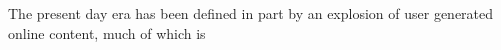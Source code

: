 \documentclass[Dissertation.tex]{subfiles}
\begin{document}
The present day era has been defined in part by an explosion of user generated online content, much of which is 
\begin{comment}

The political landscape of the western world in recent years has changed dramatically. With many nations suffering economic crises and witnessing an influx of refugees fleeing violence and war in the middle east, huge swathes of voters across the western hemisphere are rejecting the prevailing centrist dogma in favour of populist, nationalist, xenophobic right wing movements. In continental Europe nationalist parties now have a significant presence in the governments of Hungary, Poland, Austria, Italy and Germanys 

In America traditional republican candidates lost the primaries to the demagoguery of Donald Trump, while establishment candidate Hillary Clinton failed to energise the centre-left vote%

There are a great number of socio-political and economic factors that can explain the expansion of the far right in Europe and America, but modern technology has almost certainly catalysed its rise to prominence. In particular, this is characterised by two related but opposing phenomena: the democratisation of journalism and the proliferation of hyper-polarized echo-chambers. The hegemony of corporate giants and state broadcasters has been disrupted by the explosion of social media and micro-blogging:  world events are now documented in real time on Twitter and Facebook live streams, and any person with a computer can now publish a blog for the world to read. It is easier than ever to access and consume news from countless different sources, yet Gaughan \cite{gaughanIlliberalDemocracyToxic2017} argues that a toxic mix of fake news, hyperpolarization and electoral manipulation has led to partisan divides being greater than ever. Political opinions are polarized and hardened by ranking algorithms that prioritise sensationalism and emotion over veracity and integrity, while internet hyper connectivity provides radical, fringe viewpoints a platform around which to build communities safe from critical debate. 

Following a a long and bitterly fought political campaign spearheaded by the United Kingdom Independence Party (UKIP), in 2016 the world looked on in shock as Britain voted to leave the EU by national referendum. Drawing many parallels to the election victory of Donald Trump, the Brexit referendum was marked by misinformation, vehement partisanship and an outcome that polls failed to predict.


\end{comment}
\end{document}
